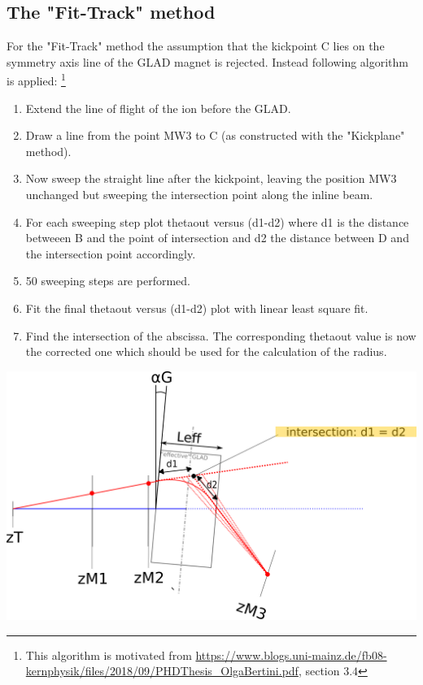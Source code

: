 \documentclass[12pt, letterpaper]{article}
\begin{document}
\subsection{The "Fit-Track" method}
For the "Fit-Track" method the assumption that the kickpoint C lies on the symmetry axis line of the GLAD magnet is rejected. Instead following algorithm is applied: \footnote{This algorithm is motivated from \url{https://www.blogs.uni-mainz.de/fb08-kernphysik/files/2018/09/PHDThesis_OlgaBertini.pdf}, section $3.4$  }\\
\begin{enumerate}
\item Extend the line of flight of the ion before the GLAD.
\item Draw a line from the point MW3 to C (as constructed with the "Kickplane" method).
\item Now sweep the straight line after the kickpoint, leaving the position MW3 unchanged but sweeping the intersection point along the inline beam.
\item For each sweeping step plot theta\textunderscore out versus (d1-d2) where d1 is the distance betweeen B and the point of intersection and d2 the distance between D and the intersection point accordingly.
\item 50 sweeping steps are performed.
\item Fit the final theta\textunderscore out versus (d1-d2) plot with linear least square fit. 
\item Find the intersection of the abscissa. The corresponding theta\textunderscore out value is now the corrected one which should be used for the calculation of the radius.
\end{enumerate}
\begin{center}
	\includegraphics[width=1.0\textwidth]{tracking_alg_ALADIN_s.png}
\end{center}
\end{document}
